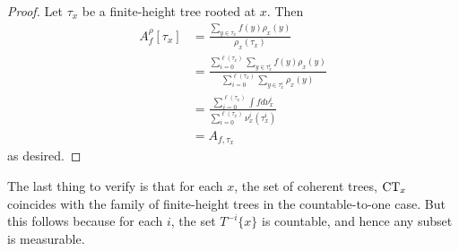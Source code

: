 \documentclass{article}
\newcommand{\CT}{\textmd{CT}}
\theoremstyle{definition}
\begin{document}
\begin{proof}
    Let $ \tau_x $ be a finite-height tree rooted at $ x $. Then
    \begin{align*}
        A^\rho_f[\tau_x] &= \frac{\sum_{y\in \tau_x} f(y)\rho_x(y)}{\rho_x(\tau_x)}\\
        &= \frac{\sum_{i=0}^{\ell(\tau_x)} \sum_{y\in \tau_x^i} f(y) \rho_x(y)}{\sum_{i=0}^{\ell(\tau_x)} \sum_{y\in \tau_x^i} \rho_x(y)}\\
        &= \frac{\sum_{i=0}^{\ell(\tau_x)} \int f d\nu_x^i}{\sum_{i=0}^{\ell(\tau_x)} \nu^i_x (\tau_x^i)}\\
        &= A_{f,\tau_x}
    \end{align*}
    as desired.
\end{proof}
\noindent The last thing to verify is that for each $ x $, the set of coherent trees, $ \CT_x $ coincides with the family of finite-height trees in the countable-to-one case. But this follows because for each $ i $, the set $ T^{-i}\{x\} $ is countable, and hence any subset is measurable. 
\newpage
\printbibliography
\end{document}
